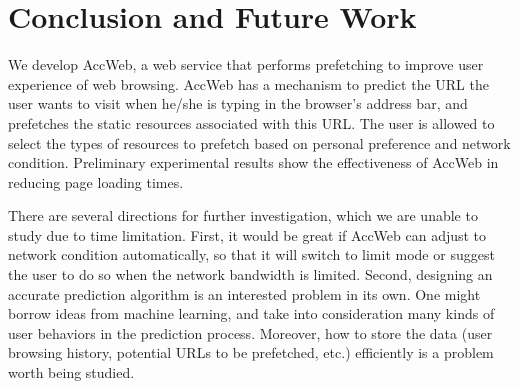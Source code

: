 \section{Conclusion and Future Work}
\label{sec:conclusion}

We develop AccWeb, a web service that performs prefetching to improve user experience of web browsing. AccWeb has a mechanism to predict the URL the user wants to visit when he/she is typing in the browser’s address bar, and prefetches the static resources associated with this URL. The user is allowed to select the types of resources to prefetch based on personal preference and network condition. Preliminary experimental results show the effectiveness of AccWeb in reducing page loading times.

There are several directions for further investigation, which we are unable to study due to time limitation. First, it would be great if AccWeb can adjust to network condition automatically, so that it will switch to limit mode or suggest the user to do so when the network bandwidth is limited. Second, designing an accurate prediction algorithm is an interested problem in its own. One might borrow ideas from machine learning, and take into consideration many kinds of user behaviors in the prediction process. Moreover, how to store the data (user browsing history, potential URLs to be prefetched, etc.) efficiently is a problem worth being studied.
